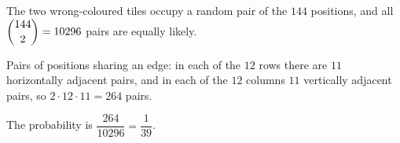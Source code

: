 The two wrong-coloured tiles occupy a random pair of the $144$ positions, and all $\dbinom{144}{2}=10296$ pairs are equally likely.

Pairs of positions sharing an edge: in each of the $12$ rows there are $11$ horizontally adjacent pairs, and in each of the $12$ columns $11$ vertically adjacent pairs, so $2\cdot12\cdot11=264$ pairs.

The probability is $\dfrac{264}{10296}=\boxed{\dfrac{1}{39}}$.
